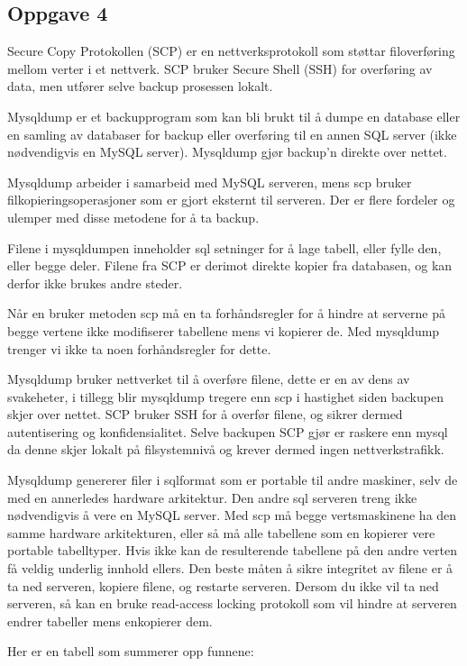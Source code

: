 \documentclass[a4paper, norsk, 12pt]{article}
\begin{document}
\subsection{Oppgave 4}
Secure Copy Protokollen (SCP) er en nettverksprotokoll som støttar filoverføring mellom verter i et nettverk. SCP bruker Secure Shell (SSH) for overføring av data, men utfører selve backup prosessen lokalt.

Mysqldump er et backupprogram som kan bli brukt til å dumpe en database eller en samling av databaser for backup eller overføring til en annen SQL server (ikke nødvendigvis en MySQL server). Mysqldump gjør backup’n direkte over nettet.

Mysqldump arbeider i samarbeid med MySQL serveren, mens scp bruker filkopieringsoperasjoner som er gjort eksternt til serveren. Der er flere fordeler og ulemper med disse metodene for å ta backup.

Filene i mysqldumpen inneholder sql setninger for å lage tabell, eller fylle den, eller begge deler. Filene fra SCP er derimot direkte kopier fra databasen, og kan derfor ikke brukes andre steder.

Når en bruker metoden scp må en ta forhåndsregler for å hindre at serverne på begge vertene ikke modifiserer tabellene mens vi kopierer de. Med mysqldump trenger vi ikke ta noen forhåndsregler for dette.

Mysqldump bruker nettverket til å overføre filene, dette er en av dens av svakeheter, i tillegg blir mysqldump tregere enn scp i hastighet siden backupen skjer over nettet. SCP bruker SSH for å overfør filene, og sikrer dermed autentisering og konfidensialitet. Selve backupen SCP gjør er raskere enn mysql da denne skjer lokalt på filsystemnivå og krever dermed ingen nettverkstrafikk.

Mysqldump genererer filer i sqlformat som er portable til andre maskiner, selv de med en annerledes hardware arkitektur. Den andre sql serveren treng ikke nødvendigvis å vere en MySQL server. Med scp må begge vertsmaskinene ha den samme hardware arkitekturen, eller så må alle tabellene som en kopierer vere portable tabelltyper. Hvis ikke kan de resulterende tabellene på den andre verten få veldig underlig innhold ellers. Den beste måten å sikre integritet av filene er å ta ned serveren, kopiere filene, og restarte serveren. Dersom du ikke vil ta ned serveren, så kan en bruke read-access locking protokoll som vil hindre at serveren endrer tabeller mens enkopierer dem.

Her er en tabell som summerer opp funnene:
\end{document}

